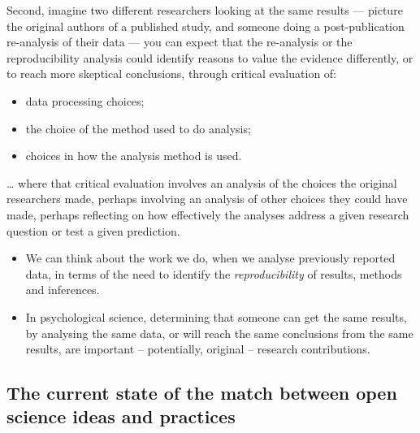 \documentclass[
  letterpaper,
  DIV=11,
  numbers=noendperiod]{scrreprt}
\providecommand{\tightlist}{%
  \setlength{\itemsep}{0pt}\setlength{\parskip}{0pt}}\usepackage{longtable,booktabs,array}
\begin{document}
Second, imagine two different researchers looking at the same results
--- picture the original authors of a published study, and someone doing
a post-publication re-analysis of their data --- you can expect that the
re-analysis or the reproducibility analysis could identify reasons to
value the evidence differently, or to reach more skeptical conclusions,
through critical evaluation of:

\begin{itemize}
\tightlist
\item
  data processing choices;
\item
  the choice of the method used to do analysis;
\item
  choices in how the analysis method is used.
\end{itemize}

\ldots{} where that critical evaluation involves an analysis of the
choices the original researchers made, perhaps involving an analysis of
other choices they could have made, perhaps reflecting on how
effectively the analyses address a given research question or test a
given prediction.

\begin{tcolorbox}[enhanced jigsaw, opacitybacktitle=0.6, title=\textcolor{quarto-callout-tip-color}{\faLightbulb}\hspace{0.5em}{Tip}, arc=.35mm, colbacktitle=quarto-callout-tip-color!10!white, colframe=quarto-callout-tip-color-frame, leftrule=.75mm, opacityback=0, breakable, titlerule=0mm, left=2mm, bottomrule=.15mm, toprule=.15mm, colback=white, coltitle=black, bottomtitle=1mm, toptitle=1mm, rightrule=.15mm]

\begin{itemize}
\tightlist
\item
  We can think about the work we do, when we analyse previously reported
  data, in terms of the need to identify the \emph{reproducibility} of
  results, methods and inferences.
\item
  In psychological science, determining that someone can get the same
  results, by analysing the same data, or will reach the same
  conclusions from the same results, are important -- potentially,
  original -- research contributions.
\end{itemize}

\end{tcolorbox}

\hypertarget{the-current-state-of-the-match-between-open-science-ideas-and-practices}{%
\subsection{The current state of the match between open science ideas
and
practices}\label{the-current-state-of-the-match-between-open-science-ideas-and-practices}}
\end{document}
